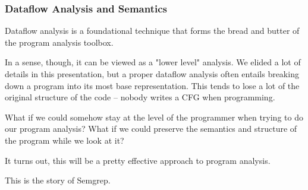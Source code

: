 \documentclass[aspectratio=169, handout]{beamer}
\begin{document}
 \begin{frame}[fragile]
   \frametitle{Dataflow Analysis and Semantics}

   Dataflow analysis is a foundational technique that forms the bread and butter
   of the program analysis toolbox.

   \pause
   \vspace{\fill}

   In a sense, though, it can be viewed as a "lower level" analysis. We elided a lot
   of details in this presentation, but a proper dataflow analysis often entails breaking
   down a program into its most base representation. This tends to lose a lot of the
   original structure of the code -- nobody writes a CFG when programming.

   \pause
   \vspace{\fill}

   What if we could somehow stay at the level of the programmer when trying to do our
   program analysis? What if we could preserve the semantics and structure of the
   program while we look at it?

   \pause
   \vspace{\fill}

   It turns out, this will be a pretty effective approach to program analysis.

   \pause
   \vspace{\fill}

   This is the story of Semgrep.
 \end{frame}

\end{document}
